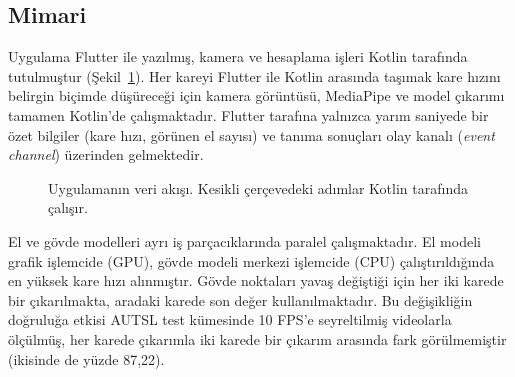 \subsection{Mimari}

Uygulama Flutter ile yazılmış, kamera ve hesaplama işleri Kotlin tarafında
tutulmuştur (Şekil~\ref{fig:mimari}). Her kareyi Flutter ile Kotlin arasında taşımak
kare hızını belirgin biçimde düşüreceği için kamera görüntüsü, MediaPipe ve model
çıkarımı tamamen Kotlin'de çalışmaktadır. Flutter tarafına yalnızca yarım saniyede bir
özet bilgiler (kare hızı, görünen el sayısı) ve tanıma sonuçları olay kanalı
(\textit{event channel}) üzerinden gelmektedir.

\begin{figure}[H]
\centering
{}
\caption{Uygulamanın veri akışı. Kesikli çerçevedeki adımlar Kotlin tarafında çalışır.}
\label{fig:mimari}
\end{figure}

El ve gövde modelleri ayrı iş parçacıklarında paralel çalışmaktadır. El modeli
grafik işlemcide (GPU), gövde modeli merkezi işlemcide (CPU) çalıştırıldığında en
yüksek kare hızı alınmıştır. Gövde noktaları yavaş değiştiği için her iki karede bir
çıkarılmakta, aradaki karede son değer kullanılmaktadır. Bu değişikliğin doğruluğa
etkisi AUTSL test kümesinde 10 FPS'e seyreltilmiş videolarla ölçülmüş, her karede
çıkarımla iki karede bir çıkarım arasında fark görülmemiştir (ikisinde de yüzde 87,22).

